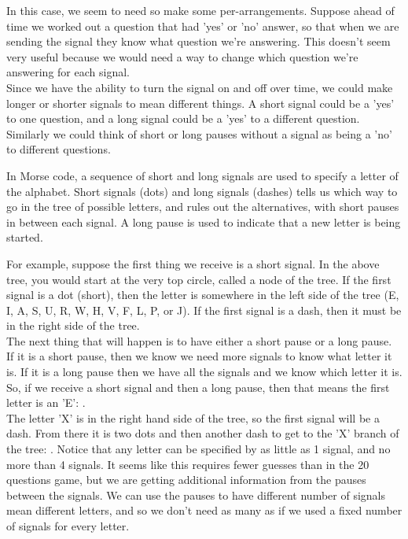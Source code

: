 In this case, we seem to need so make some per-arrangements. Suppose ahead of time we worked out a question that had 'yes' or 'no' answer, so that when we are sending the signal they know what question we're answering. This doesn't seem very useful because we would need a way to change which question we're answering for each signal.\\

Since we have the ability to turn the signal on and off over time, we could make longer or shorter signals to mean different things. A short signal could be a 'yes' to one question, and a long signal could be a 'yes' to a different question. Similarly we could think of short or long pauses without a signal as being a 'no' to different questions.

\begin{center}\end{center}

In Morse code, a sequence of short and long signals are used to specify a letter of the alphabet. Short signals (dots) and long signals (dashes) tells us which way to go in the tree of possible letters, and rules out the alternatives, with short pauses in between each signal. A long pause is used to indicate that a new letter is being started.


\begin{center}\end{center}

For example, suppose the first thing we receive is a short signal. In the above tree, you would start at the very top circle, called a node of the tree. If the first signal is a dot (short), then the letter is somewhere in the left side of the tree (E, I, A, S, U, R, W, H, V, F, L, P, or J). If the first signal is a dash, then it must be in the right side of the tree.\\

The next thing that will happen is to have either a short pause or a long pause. If it is a short pause, then we know we need more signals to know what letter it is. If it is a long pause then we have all the signals and we know which letter it is. So, if we receive a short signal and then a long pause, then that means the first letter is an 'E': \mdit.\\

The letter 'X' is in the right hand side of the tree, so the first signal will be a dash. From there it is two dots and then another dash to get to the 'X' branch of the tree: \mdah\mdit\mdit\mdah. Notice that any letter can be specified by as little as 1 signal, and no more than 4 signals. It seems like this requires fewer guesses than in the 20 questions game, but we are getting additional information from the pauses between the signals. We can use the pauses to have different number of signals mean different letters, and so we don't need as many as if we used a fixed number of signals for every letter.

